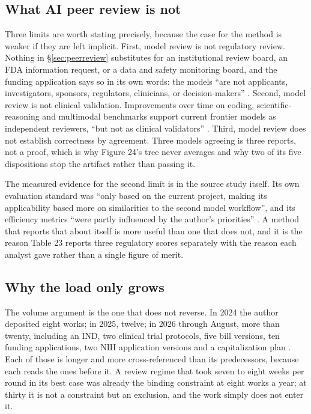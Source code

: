 \subsection{What AI peer review is not}

Three limits are worth stating precisely, because the case for the method is
weaker if they are left implicit. First, model review is not regulatory review.
Nothing in \S\ref{sec:peerreview} substitutes for an institutional review board, an FDA
information request, or a data and safety monitoring board, and the funding
application says so in its own words: the models ``are not applicants,
investigators, sponsors, regulators, clinicians, or decision-makers''
\cite{rfarm27001v2}. Second, model review is not clinical validation.
Improvements over time on coding, scientific-reasoning and multimodal benchmarks
support current frontier models as independent reviewers, ``but not as clinical
validators'' \cite{rfarm27001v2, aiprgliomatc}. Third, model review does not
establish correctness by agreement. Three models agreeing is three reports, not
a proof, which is why Figure 24's tree never averages and why two of its five
dispositions stop the artifact rather than passing it.

The measured evidence for the second limit is in the source study itself. Its
own evaluation standard was ``only based on the current project, making its
applicability based more on similarities to the second model workflow'', and its
efficiency metrics ``were partly influenced by the author's priorities''
\cite{aiprgliomatc}. A method that reports that about itself is more useful than
one that does not, and it is the reason Table 23 reports three regulatory scores
separately with the reason each analyst gave rather than a single figure of
merit.

\subsection{Why the load only grows}

The volume argument is the one that does not reverse. In 2024 the author
deposited eight works; in 2025, twelve; in 2026 through August, more than
twenty, including an IND, two clinical trial protocols, five bill versions, ten
funding applications, two NIH application versions and a capitalization plan
\cite{repo2026}. Each of those is longer and more cross-referenced than its
predecessors, because each reads the ones before it. A review regime that took
seven to eight weeks per round in its best case was already the binding
constraint at eight works a year; at thirty it is not a constraint but an
exclusion, and the work simply does not enter it.

